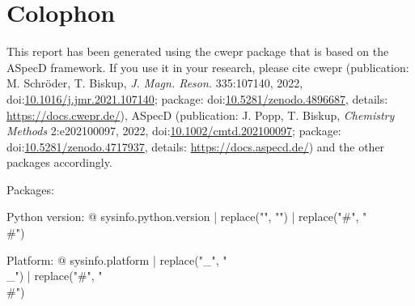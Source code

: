 \section*{Colophon}

This report has been generated using the cwepr package that is based on the ASpecD framework. If you use it in your research, please cite cwepr (publication: M. Schröder, T. Biskup, \emph{J. Magn. Reson.} 335:107140, 2022, doi:\href{https://doi.org/10.1016/j.jmr.2021.107140}{10.1016/j.jmr.2021.107140}; package: doi:\href{https://doi.org/10.5281/zenodo.4896687}{10.5281/zenodo.4896687}, details: \url{https://docs.cwepr.de/}), ASpecD (publication: J. Popp, T. Biskup, \emph{Chemistry Methods} 2:e202100097, 2022, doi:\href{https://doi.org/10.1002/cmtd.202100097}{10.1002/cmtd.202100097}; package: doi:\href{https://doi.org/10.5281/zenodo.4717937}{10.5281/zenodo.4717937}, details: \url{https://docs.aspecd.de/}) and the other packages accordingly.

Packages: %


Python version: {@ sysinfo.python.version | replace("\n", "") | replace("#", "\\#") }

Platform: {@ sysinfo.platform | replace("_", "\\_") | replace("#", "\\#") }
